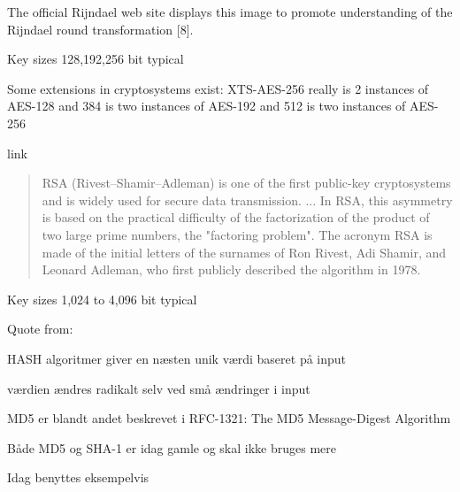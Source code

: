 \documentclass[Screen16to9,17pt]{foils}
\begin{document}
\begin{list2}
\item The official Rijndael web site displays this image to promote understanding of the Rijndael round transformation [8].
\item Key sizes 128,192,256 bit typical
\item Some extensions in cryptosystems exist: XTS-AES-256 really is 2 instances of AES-128 and 384 is two instances of AES-192 and 512 is two instances of AES-256
\item {}
\end{list2}


link

\begin{quote}
RSA (Rivest–Shamir–Adleman) is one of the first public-key cryptosystems and is widely used for secure data transmission. ...
In RSA, this asymmetry is based on the practical difficulty of the factorization of the product of two large prime numbers, the "factoring problem". The acronym RSA is made of the initial letters of the surnames of Ron Rivest, Adi Shamir, and Leonard Adleman, who first publicly described the algorithm in 1978.
\end{quote}

\begin{list2}
\item Key sizes 1,024 to 4,096 bit typical
\item  Quote from: 
\end{list2}




\begin{list1}
\item HASH algoritmer giver en næsten unik værdi baseret på input
\item værdien ændres radikalt selv ved små ændringer i input
\item MD5 er blandt andet beskrevet i RFC-1321: The MD5 Message-Digest
  Algorithm
\item Både MD5 og SHA-1 er idag gamle og skal ikke bruges mere
\item Idag benyttes eksempelvis 
\end{list1}
\end{document}
